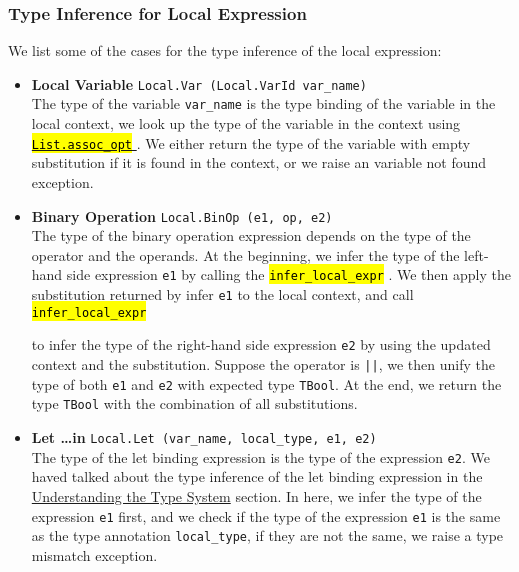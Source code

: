 \documentclass{article}
\newcommand{\highlighttexttt}[2][black]{ %
  \sethlcolor{cyan!10} %
  \texttt{\textcolor{#1}{\hl{#2}}}
}
\begin{document}
    \subsubsection{Type Inference for Local Expression}\label{local_expr}
        We list some of the cases for the type inference of the local expression:
        \begin{itemize}
            \item \textbf{Local Variable} \texttt{Local.Var (Local.VarId var\_name)}\\
                  The type of the variable \texttt{var\_name} is the type binding of the variable in the local context, we look up the type of the variable in the context
                  using \href{https://ocaml.org/manual/5.2/api/List.html#VALassoc_opt}{\highlighttexttt[orange]{List.assoc\_opt}}. We either
                  return the type of the variable with empty substitution if it is found in the context, or we raise an variable not found exception.
            \item \textbf{Binary Operation} \texttt{Local.BinOp (e1, op, e2)}\\
                  The type of the binary operation expression depends on the type of the operator and the operands.
                  At the beginning, we infer the type of the left-hand side expression \texttt{e1} by calling the \highlighttexttt{infer\_local\_expr}.
                  We then apply the substitution returned by infer \texttt{e1} to the local context, and call \highlighttexttt{infer\_local\_expr}
                  to infer the type of the right-hand side expression \texttt{e2} by using the updated context and the substitution.
                  Suppose the operator is \texttt{||}, we then unify the type of both \texttt{e1} and \texttt{e2} with expected type \texttt{TBool}.
                  At the end, we return the type \texttt{TBool} with the combination of all substitutions.
            \item \textbf{Let \ldots in} \texttt{Local.Let (var\_name, local\_type, e1, e2)}\\
                  The type of the let binding expression is the type of the expression \texttt{e2}. We haved talked about the type inference of the
                  let binding expression in the \hyperref[understand_type_system]{Understanding the Type System} section. In here,
                  we infer the type of the expression \texttt{e1} first, and we check if the type of the expression \texttt{e1}
                  is the same as the type annotation \texttt{local\_type}, if they are not the same, we raise a type mismatch exception.

\end{itemize}
\end{document}

